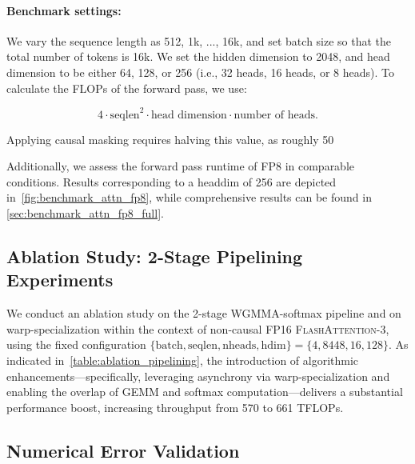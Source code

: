 \begin{itemize}
\paragraph{Benchmark settings:} We vary the sequence length as 512, 1k, ..., 16k, and set batch size so that the total number of tokens is 16k. We set the hidden dimension to 2048, and head dimension to be either 64, 128, or 256 (i.e., 32 heads, 16 heads, or 8 heads). To calculate the FLOPs of the forward pass, we use:

\begin{equation*}
  4 \cdot \text{seqlen}^2 \cdot \text{head dimension} \cdot \text{number of heads}.
\end{equation*}

Applying causal masking requires halving this value, as roughly 50%

Additionally, we assess the forward pass runtime of FP8 in comparable conditions. Results corresponding to a headdim of 256 are depicted in~\cref{fig:benchmark_attn_fp8}, while comprehensive results can be found in \cref{sec:benchmark_attn_fp8_full}.

\subsection{Ablation Study: 2-Stage Pipelining Experiments}
\label{sec:2-stage-pipelining-experiments}

We conduct an ablation study on the 2-stage WGMMA-softmax pipeline and on warp-specialization within the context of non-causal FP16 \textsc{FlashAttention-3}, using the fixed configuration $\{\text{batch}, \text{seqlen}, \text{nheads}, \text{hdim}\} = \{ 4, 8448, 16, 128\}$. As indicated in~\cref{table:ablation_pipelining}, the introduction of algorithmic enhancements—specifically, leveraging asynchrony via warp-specialization and enabling the overlap of GEMM and softmax computation—delivers a substantial performance boost, increasing throughput from 570 to 661 TFLOPs.

\subsection{Numerical Error Validation}
\label{sec:numerical_error}


\end{itemize}
